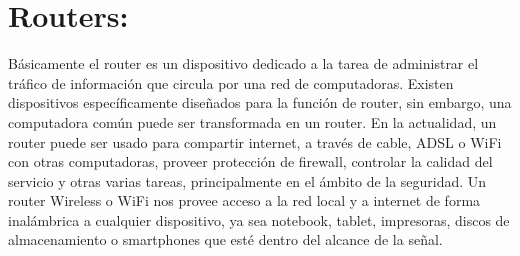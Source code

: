 \documentclass[a4paper, 11pt, oneside]{article}
\begin{document}
\section*{Routers:}
Básicamente el router es un dispositivo dedicado a la tarea de administrar el tráfico de información que circula por una red de computadoras. Existen dispositivos específicamente diseñados para la función de router, sin embargo, una computadora común puede ser transformada en un router. En la actualidad, un router puede ser usado para compartir internet, a través de cable, ADSL o WiFi con otras computadoras, proveer protección de firewall, controlar la calidad del servicio y otras varias tareas, principalmente en el ámbito de la seguridad. Un router Wireless o WiFi nos provee acceso a la red local y a internet de forma inalámbrica a cualquier dispositivo, ya sea notebook, tablet, impresoras, discos de almacenamiento o smartphones que esté dentro del alcance de la señal.
\end{document}
